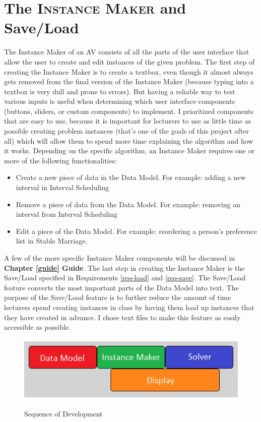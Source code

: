 \section{The \textsc{Instance Maker} and Save/Load}
\hspace{-0.26in}
The Instance Maker of an AV consists of all the parts of the user interface 
that allow the user to create and edit instances of the given problem. 
The first step of creating the Instance Maker is to create a textbox, 
even though it almost always gets removed from the final version of the Instance Maker 
(because typing into a textbox is very dull and prone to errors). 
But having a reliable way to test various inputs is useful when determining
which user interface components (buttons, sliders, or custom components) to implement.
\newline\newline
I prioritized components that are easy to use, 
because it is important for lecturers to use as little time as possible
creating problem instances (that's one of the goals of this project after all)
which will allow them to spend more time explaining the algorithm and how it works. 
\newline\newline
Depending on the specific algorithm, an Instance Maker requires one or more of 
the following functionalities:
\begin{itemize}
	\item Create a new piece of data in the Data Model. 
		\subitem For example: adding a new interval in Interval Scheduling
	\item Remove a piece of data from the Data Model.
		\subitem For example: removing an interval from Interval Scheduling
	\item Edit a piece of the Data Model.
		\subitem For example: reordering a person's preference list in Stable Marriage.
\end{itemize}
A few of the more specific Instance Maker components will be discussed in \textbf{Chapter \ref{guide} Guide}.
\newline\newline
The last step in creating the Instance Maker is the Save/Load specified in 
Requirements \ref{req-load} and \ref{req-save}.
The Save/Load feature converts the most important parts of the Data Model into text. 
The purpose of the Save/Load feature is 
to further reduce the amount of time lecturers spend creating instances in class
by having them load up instances that they have created in advance.
I chose text files to make this feature as easily accessible as possible. 
%
\begin{figure}[ht]
	\centering
	\caption{Sequence of Development}	
	\includegraphics[height=1.25in]{images/development-process-timing.png}
	\label{fig-develpoment-process-timing}
\end{figure}
